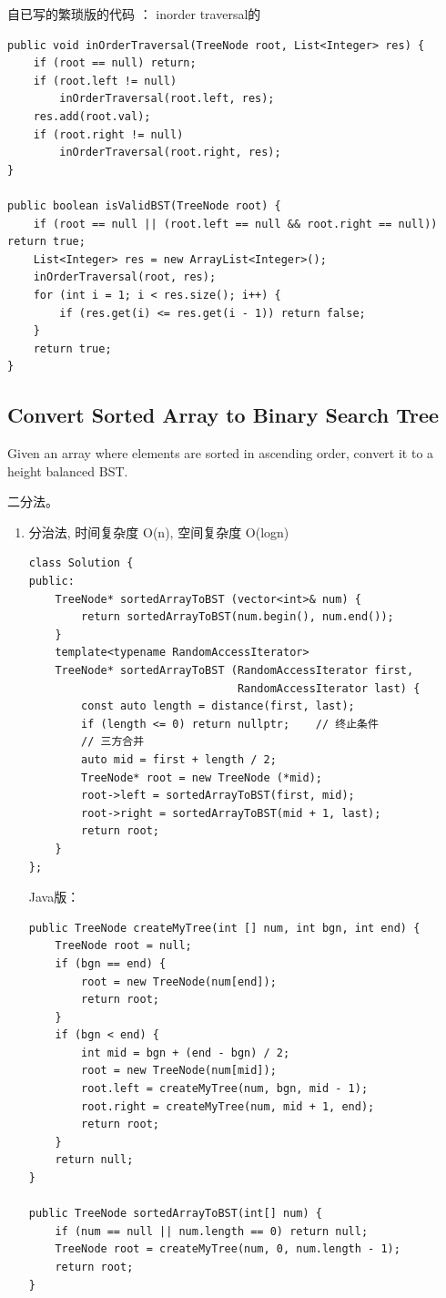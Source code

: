 \documentclass[12pt]{book}
\begin{document}
自已写的繁琐版的代码 ： inorder traversal的
\lstset{language=java,label= ,caption= ,numbers=none}
\begin{lstlisting}
public void inOrderTraversal(TreeNode root, List<Integer> res) {
    if (root == null) return;
    if (root.left != null)
        inOrderTraversal(root.left, res);
    res.add(root.val);
    if (root.right != null)
        inOrderTraversal(root.right, res);
}
        
public boolean isValidBST(TreeNode root) {
    if (root == null || (root.left == null && root.right == null)) return true;
    List<Integer> res = new ArrayList<Integer>();
    inOrderTraversal(root, res);
    for (int i = 1; i < res.size(); i++) {
        if (res.get(i) <= res.get(i - 1)) return false;
    }
    return true;
}
\end{lstlisting}

\subsection{Convert Sorted Array to Binary Search Tree}
\label{sec-4-4-2}
Given an array where elements are sorted in ascending order, convert it to a height balanced BST.

二分法。

\begin{enumerate}
\item 分治法, 时间复杂度 O(n), 空间复杂度 O(logn)
\label{sec-4-4-2-1}

\lstset{language=java,label= ,caption= ,numbers=none}
\begin{lstlisting}
class Solution {
public:
    TreeNode* sortedArrayToBST (vector<int>& num) {
        return sortedArrayToBST(num.begin(), num.end());
    }
    template<typename RandomAccessIterator>
    TreeNode* sortedArrayToBST (RandomAccessIterator first,
                                RandomAccessIterator last) {
        const auto length = distance(first, last);
        if (length <= 0) return nullptr;    // 终止条件
        // 三方合并
        auto mid = first + length / 2;
        TreeNode* root = new TreeNode (*mid);
        root->left = sortedArrayToBST(first, mid);
        root->right = sortedArrayToBST(mid + 1, last);
        return root;
    }
};
\end{lstlisting}

Java版：

\lstset{language=java,label= ,caption= ,numbers=none}
\begin{lstlisting}
public TreeNode createMyTree(int [] num, int bgn, int end) {
    TreeNode root = null;
    if (bgn == end) {
        root = new TreeNode(num[end]);
        return root;
    }
    if (bgn < end) {
        int mid = bgn + (end - bgn) / 2;
        root = new TreeNode(num[mid]);
        root.left = createMyTree(num, bgn, mid - 1);
        root.right = createMyTree(num, mid + 1, end);
        return root;
    }
    return null;
}
        
public TreeNode sortedArrayToBST(int[] num) {
    if (num == null || num.length == 0) return null;
    TreeNode root = createMyTree(num, 0, num.length - 1);
    return root;
}
\end{lstlisting}
\end{enumerate}
\end{document}
